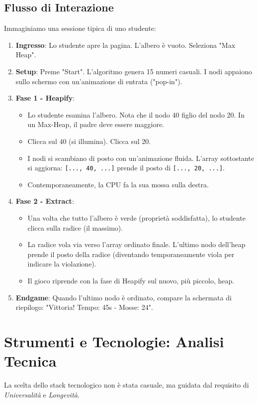 \documentclass[openany]{theme/uniprthesis}
\begin{document}
\subsection{Flusso di Interazione}
Immaginiamo una sessione tipica di uno studente:
\begin{enumerate}
    \item \textbf{Ingresso}: Lo studente apre la pagina. L'albero è vuoto. Seleziona "Max Heap".
    \item \textbf{Setup}: Preme "Start". L'algoritmo genera 15 numeri casuali. I nodi appaiono sullo schermo con un'animazione di entrata ("pop-in").
    \item \textbf{Fase 1 - Heapify}:
        \begin{itemize}
            \item Lo studente esamina l'albero. Nota che il nodo 40  figlio del nodo 20. In un Max-Heap, il padre deve essere maggiore.
            \item Clicca sul 40 (si illumina). Clicca sul 20.
            \item I nodi si scambiano di posto con un'animazione fluida. L'array sottostante si aggiorna: \texttt{[..., 40, ...]} prende il posto di \texttt{[..., 20, ...]}.
            \item Contemporaneamente, la CPU fa la sua mossa sulla destra.
        \end{itemize}
    \item \textbf{Fase 2 - Extract}:
        \begin{itemize}
            \item Una volta che tutto l'albero è verde (proprietà soddisfatta), lo studente clicca sulla radice (il massimo).
            \item La radice vola via verso l'array ordinato finale. L'ultimo nodo dell'heap prende il posto della radice (diventando temporaneamente viola per indicare la violazione).
            \item Il gioco riprende con la fase di Heapify sul nuovo, più piccolo, heap.
        \end{itemize}
    \item \textbf{Endgame}: Quando l'ultimo nodo è ordinato, compare la schermata di riepilogo: "Vittoria! Tempo: 45s - Mosse: 24".
\end{enumerate}

\section{Strumenti e Tecnologie: Analisi Tecnica}
La scelta dello stack tecnologico non è stata casuale, ma guidata dal requisito di \textit{Universalità} e \textit{Longevità}.
\end{document}
